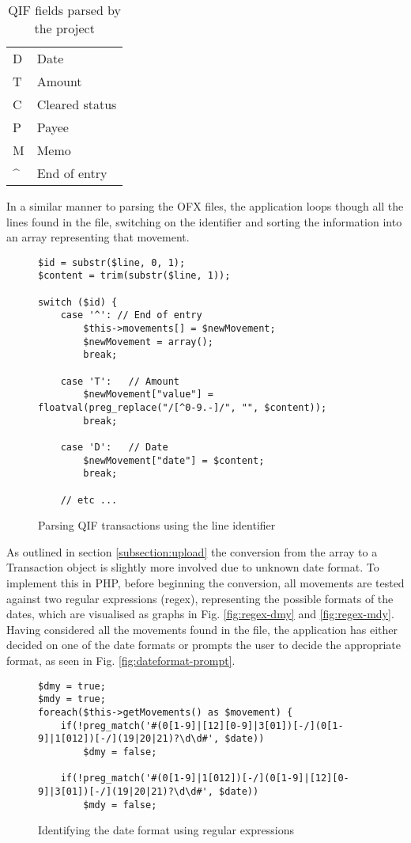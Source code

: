 \begin{table}[h]
\centering
\begin{tabular}{ll}
D                  & Date           \\
T                  & Amount         \\
C                  & Cleared status \\
P                  & Payee          \\
M                  & Memo           \\
\textasciicircum   & End of entry  
\end{tabular}
\caption{QIF fields parsed by the project}
\label{table:qiffields}
\end{table}

In a similar manner to parsing the OFX files, the application loops though all the lines found in the file, switching on the identifier and sorting the information into an array representing that movement. 

\begin{figure}
\lstset{style=phpcolor}
\begin{lstlisting}
$id = substr($line, 0, 1);
$content = trim(substr($line, 1));

switch ($id) {
	case '^': // End of entry
		$this->movements[] = $newMovement;
		$newMovement = array();
		break;
		
	case 'T': 	// Amount
		$newMovement["value"] = floatval(preg_replace("/[^0-9.-]/", "", $content));
		break;
		
	case 'D': 	// Date
		$newMovement["date"] = $content;
		break;
		
	// etc ...
\end{lstlisting}
\caption{Parsing QIF transactions using the line identifier}
\end{figure}

As outlined in section \ref{subsection:upload} the conversion from the array to a Transaction object is slightly more involved due to unknown date format. To implement this in PHP, before beginning the conversion, all movements are tested against two regular expressions (regex), representing the possible formats of the dates, which are visualised as graphs in Fig. \ref{fig:regex-dmy} and \ref{fig:regex-mdy}. 
%
Having considered all the movements found in the file, the application has either decided on one of the date formats or prompts the user to decide the appropriate format, as seen in Fig. \ref{fig:dateformat-prompt}.

\begin{figure}
\lstset{style=phpcolor}
\begin{lstlisting}
$dmy = true;
$mdy = true;
foreach($this->getMovements() as $movement) {
	if(!preg_match('#(0[1-9]|[12][0-9]|3[01])[-/](0[1-9]|1[012])[-/](19|20|21)?\d\d#', $date))
		$dmy = false;
	
	if(!preg_match('#(0[1-9]|1[012])[-/](0[1-9]|[12][0-9]|3[01])[-/](19|20|21)?\d\d#', $date))
		$mdy = false;
\end{lstlisting}
\caption{Identifying the date format using regular expressions}
\end{figure}

